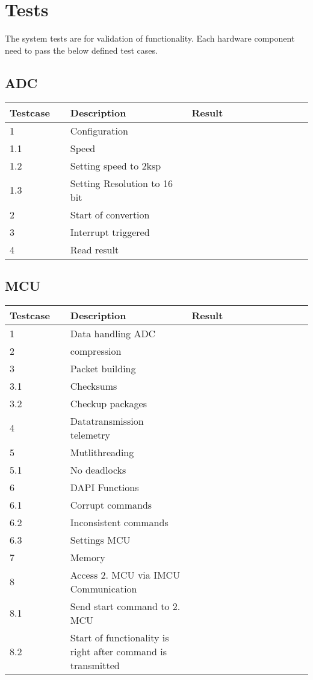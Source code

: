 

\chapter{Tests}\label{test}

The system tests are for validation of functionality. Each hardware component need to pass the below defined test cases.  

\section{ADC}\label{test:adc}

\begin{longtable}[]{|m{0.2\linewidth}| m{0.4\linewidth}| m{0.4\linewidth}|} \hline
	\textbf{Testcase} & \textbf{Description} & \textbf{Result}\\ \hline
	\endhead
1 & Configuration &\\ \hline
1.1 & Speed &\\ \hline
1.2 & Setting speed to 2ksp &\\ \hline
1.3 & Setting Resolution to 16 bit &\\ \hline
2 & Start of convertion &\\ \hline
3 & Interrupt triggered &\\ \hline
4 & Read result &\\ \hline

\end{longtable}

\section{MCU}\label{test:mcu}

\begin{longtable}[]{|m{0.2\linewidth}| m{0.4\linewidth}| m{0.4\linewidth}|} \hline
	\textbf{Testcase} & \textbf{Description} & \textbf{Result}\\ \hline
	\endhead
1 & Data handling ADC &\\ \hline
2 & compression &\\ \hline
3 & Packet building &\\ \hline
3.1 & Checksums &\\ \hline
3.2 & Checkup packages &\\ \hline
4 & Datatransmission telemetry &\\ \hline
5 & Mutlithreading &\\ \hline
5.1 & No deadlocks &\\ \hline
6 & DAPI Functions &\\ \hline
6.1 & Corrupt commands &\\ \hline
6.2 & Inconsistent commands &\\ \hline
6.3 & Settings MCU &\\ \hline
7 & Memory &\\ \hline
8 & Access 2. MCU via IMCU Communication & \\ \hline
8.1 & Send start command to 2. MCU & \\ \hline
8.2 & Start of functionality is right after command is transmitted & \\ \hline 
\end{longtable}

